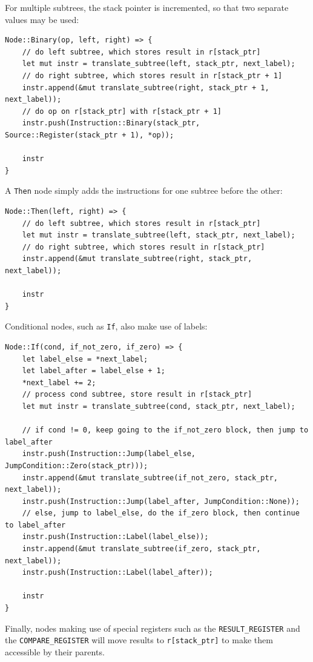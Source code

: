 \documentclass{report}
\begin{document}
For multiple subtrees, the stack pointer is incremented, so that two separate values may be used:

\begin{verbatim}
Node::Binary(op, left, right) => {
    // do left subtree, which stores result in r[stack_ptr]
    let mut instr = translate_subtree(left, stack_ptr, next_label);
    // do right subtree, which stores result in r[stack_ptr + 1]
    instr.append(&mut translate_subtree(right, stack_ptr + 1, next_label));
    // do op on r[stack_ptr] with r[stack_ptr + 1]
    instr.push(Instruction::Binary(stack_ptr, Source::Register(stack_ptr + 1), *op));

    instr
}
\end{verbatim}

A \verb|Then| node simply adds the instructions for one subtree before the other:

\begin{verbatim}
Node::Then(left, right) => {
    // do left subtree, which stores result in r[stack_ptr]
    let mut instr = translate_subtree(left, stack_ptr, next_label);
    // do right subtree, which stores result in r[stack_ptr]
    instr.append(&mut translate_subtree(right, stack_ptr, next_label));

    instr
}
\end{verbatim}

Conditional nodes, such as \verb|If|, also make use of labels:

\begin{verbatim}
Node::If(cond, if_not_zero, if_zero) => {
    let label_else = *next_label;
    let label_after = label_else + 1;
    *next_label += 2;
    // process cond subtree, store result in r[stack_ptr]
    let mut instr = translate_subtree(cond, stack_ptr, next_label);

    // if cond != 0, keep going to the if_not_zero block, then jump to label_after
    instr.push(Instruction::Jump(label_else, JumpCondition::Zero(stack_ptr)));
    instr.append(&mut translate_subtree(if_not_zero, stack_ptr, next_label));
    instr.push(Instruction::Jump(label_after, JumpCondition::None));
    // else, jump to label_else, do the if_zero block, then continue to label_after
    instr.push(Instruction::Label(label_else));
    instr.append(&mut translate_subtree(if_zero, stack_ptr, next_label));
    instr.push(Instruction::Label(label_after));

    instr
}
\end{verbatim}

Finally, nodes making use of special registers such as the \verb|RESULT_REGISTER| and the \verb|COMPARE_REGISTER| will move results to \verb|r[stack_ptr]| to make them accessible by their parents.
\end{document}
